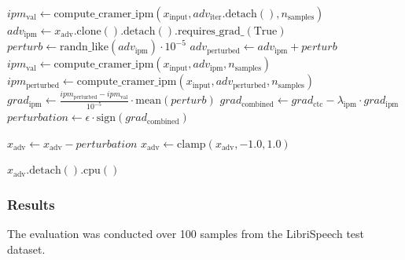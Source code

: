 \documentclass[a4paper,12pt]{article}
\begin{document}
\begin{algorithm}[H]
\begin{algorithmic}[1]
    \State {}
    \State $ipm_{\text{val}} \gets \text{compute\_cramer\_ipm}(x_{\text{input}}, adv_{\text{iter}}.\text{detach}(), n_{\text{samples}})$ 
    \State $adv_{\text{ipm}} \gets x_{\text{adv}}.\text{clone}().\text{detach}().\text{requires\_grad\_}(\text{True})$ 
    \State $perturb \gets \text{randn\_like}(adv_{\text{ipm}}) \cdot 10^{-5}$ 
    \State $adv_{\text{perturbed}} \gets adv_{\text{ipm}} + perturb$ 
    \State $ipm_{\text{val}} \gets \text{compute\_cramer\_ipm}(x_{\text{input}}, adv_{\text{ipm}}, n_{\text{samples}})$ 
    \State $ipm_{\text{perturbed}} \gets \text{compute\_cramer\_ipm}(x_{\text{input}}, adv_{\text{perturbed}}, n_{\text{samples}})$ 
    \State $grad_{\text{ipm}} \gets \frac{ipm_{\text{perturbed}} - ipm_{\text{val}}}{10^{-5}} \cdot \text{mean}(perturb)$ 
    \State $grad_{\text{combined}} \gets grad_{\text{ctc}} - \lambda_{\text{ipm}} \cdot grad_{\text{ipm}}$ 
    \State $perturbation \gets \epsilon \cdot \text{sign}(grad_{\text{combined}})$ 
    
    \State {}
    \State $x_{\text{adv}} \gets x_{\text{adv}} - perturbation$ 
    \State $x_{\text{adv}} \gets \text{clamp}(x_{\text{adv}}, -1.0, 1.0)$ 
\EndFor

\State \Return $x_{\text{adv}}.\text{detach}().\text{cpu}()$ 
\end{algorithmic}
\end{algorithm}



\subsubsection{Results}
The evaluation was conducted over 100 samples from the LibriSpeech test dataset.
\end{document}
